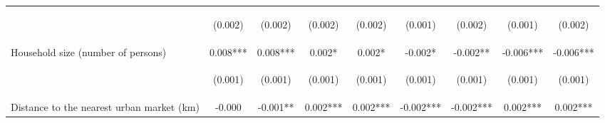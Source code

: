 \begin{center}
\begin{tabular}{lcccccccc}
\vspace{4pt} & \begin{footnotesize}(0.002)\end{footnotesize} & \begin{footnotesize}(0.002)\end{footnotesize} & \begin{footnotesize}(0.002)\end{footnotesize} & \begin{footnotesize}(0.002)\end{footnotesize} & \begin{footnotesize}(0.001)\end{footnotesize} & \begin{footnotesize}(0.002)\end{footnotesize} & \begin{footnotesize}(0.001)\end{footnotesize} & \begin{footnotesize}(0.002)\end{footnotesize} \\
Household size (number of persons) & 0.008*** & 0.008*** & 0.002* & 0.002* & -0.002* & -0.002** & -0.006*** & -0.006*** \\
\vspace{4pt} & \begin{footnotesize}(0.001)\end{footnotesize} & \begin{footnotesize}(0.001)\end{footnotesize} & \begin{footnotesize}(0.001)\end{footnotesize} & \begin{footnotesize}(0.001)\end{footnotesize} & \begin{footnotesize}(0.001)\end{footnotesize} & \begin{footnotesize}(0.001)\end{footnotesize} & \begin{footnotesize}(0.001)\end{footnotesize} & \begin{footnotesize}(0.001)\end{footnotesize} \\
Distance to the nearest urban market (km) & -0.000 & -0.001** & 0.002*** & 0.002*** & -0.002*** & -0.002*** & 0.002*** & 0.002*** \\

\end{tabular}
\end{center}

